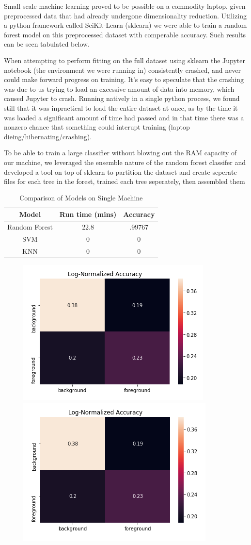 \documentclass{neu_handout}
\begin{document}
Small scale machine learning proved to be possible on a commodity laptop, given preprocessed data that had already undergone dimensionality reduction. Utilizing a python framework called SciKit-Learn (sklearn) we were able to train a random forest model on this preprocessed dataset with comperable accuracy. Such results can be seen tabulated below.

When attempting to perform fitting on the full dataset using sklearn the Jupyter notebook (the environment we were running in) consistently crashed, and never could make forward progress on training. It's easy to speculate that the crashing was due to us trying to load an excessive amount of data into memory, which caused Jupyter to crash. Running natively in a single python process, we found still that it was inpractical to load the entire dataset at once, as by the time it was loaded a significant amount of time had passed and in that time there was a nonzero chance that something could interupt training (laptop dieing/hibernating/crashing).

To be able to train a large classifier without blowing out the RAM capacity of our machine, we leveraged the ensemble nature of the random forest classifer and developed a tool on top of sklearn to partition the dataset and create seperate files for each tree in the forest, trained each tree seperately, then assembled them 

\begin{table}[h!]
\centering
 \begin{tabular}{||c c c||} 
 \hline
Model & Run time (mins) & Accuracy \\ [0.5ex] 
 \hline\hline
Random Forest & 22.8  & .99767   \\[1ex] 
 \hline
 SVM & 0  & 0 \\
\hline
KNN & 0  & 0 \\
\hline
 \end{tabular}
 \caption{Comparison of Models on Single Machine}
 \label{tab:accuracy-comparison}
\end{table}


\begin{figure}[h]
\centering
{
\includegraphics[width=0.4\linewidth]{rflocalgini}
\label{fig:rflocalgini}
}
{
\includegraphics[width=0.4\linewidth]{rflocalentropy}
\label{fig:rflocalentropy}
}
\end{figure}
\end{document}
